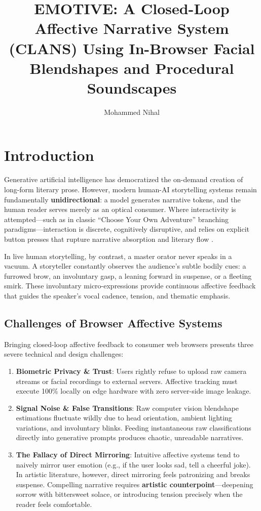 \documentclass[sigconf,nonacm]{acmart}
\title{EMOTIVE: A Closed-Loop Affective Narrative System (CLANS) Using In-Browser Facial Blendshapes and Procedural Soundscapes}
\author{Mohammed Nihal}
\affiliation{%
  \institution{Independent Researcher}
  \city{Kozhikode}
  \country{India}
}
\begin{document}
\maketitle

\section{Introduction}

Generative artificial intelligence has democratized the on-demand creation of long-form literary prose. However, modern human-AI storytelling systems remain fundamentally \textbf{unidirectional}: a model generates narrative tokens, and the human reader serves merely as an optical consumer. Where interactivity is attempted---such as in classic ``Choose Your Own Adventure'' branching paradigms---interaction is discrete, cognitively disruptive, and relies on explicit button presses that rupture narrative absorption and literary flow \cite{murray1997hamlet, ryan2001narrative}.

In live human storytelling, by contrast, a master orator never speaks in a vacuum. A storyteller constantly observes the audience's subtle bodily cues: a furrowed brow, an involuntary gasp, a leaning forward in suspense, or a fleeting smirk. These involuntary micro-expressions provide continuous affective feedback that guides the speaker's vocal cadence, tension, and thematic emphasis.

\subsection{Challenges of Browser Affective Systems}

Bringing closed-loop affective feedback to consumer web browsers presents three severe technical and design challenges:
\begin{enumerate}
    \item \textbf{Biometric Privacy \& Trust}: Users rightly refuse to upload raw camera streams or facial recordings to external servers. Affective tracking must execute 100\% locally on edge hardware with zero server-side image leakage.
    \item \textbf{Signal Noise \& False Transitions}: Raw computer vision blendshape estimations fluctuate wildly due to head orientation, ambient lighting variations, and involuntary blinks. Feeding instantaneous raw classifications directly into generative prompts produces chaotic, unreadable narratives.
    \item \textbf{The Fallacy of Direct Mirroring}: Intuitive affective systems tend to naively mirror user emotion (e.g., if the user looks sad, tell a cheerful joke). In artistic literature, however, direct mirroring feels patronizing and breaks suspense. Compelling narrative requires \textbf{artistic counterpoint}---deepening sorrow with bittersweet solace, or introducing tension precisely when the reader feels comfortable.
\end{enumerate}
\end{document}
